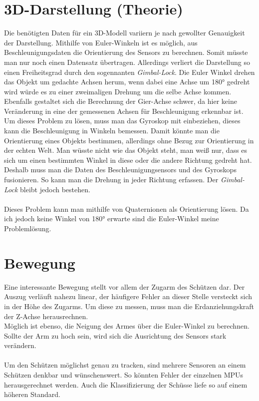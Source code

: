 \section{3D-Darstellung (Theorie)}
Die benötigten Daten für ein 3D-Modell variiern je nach gewollter Genauigkeit der Darstellung.
Mithilfe von Euler-Winkeln ist es möglich, aus Beschleunigungsdaten die Orientierung des Sensors zu berechnen.
Somit müsste man nur noch einen Datensatz übertragen. Allerdings verliert die Darstellung so einen
Freiheitsgrad durch den sogennanten \textit{Gimbal-Lock}. Die Euler Winkel drehen das Objekt um gedachte
Achsen herum, wenn dabei eine Achse um 180° gedreht wird würde es zu einer zweimaligen Drehung
um die selbe Achse kommen. Ebenfalls gestaltet sich die Berechnung der Gier-Achse schwer, da hier
keine Veränderung in eine der gemessenen Achsen für Beschleunigung erkennbar ist.
\\
Um dieses Problem zu lösen, muss man das Gyroskop mit einbeziehen, dieses kann die Beschleunigung
in Winkeln bemessen. Damit könnte man die Orientierung eines Objekts bestimmen, allerdings ohne 
Bezug zur Orientierung in der echten Welt. Man wüsste nicht wie das Objekt steht, man weiß nur, 
dass es sich um einen bestimmten Winkel in diese oder die andere Richtung gedreht hat. \\
Deshalb muss man die Daten des Beschleunigungsensors und des Gyroskops fusionieren. So kann man 
die Drehung in jeder Richtung erfassen. Der \textit{Gimbal-Lock} bleibt jedoch bestehen.\\
\\
Dieses Problem kann man mithilfe von Quaternionen als Orientierung lösen. Da ich jedoch keine 
Winkel von 180° erwarte sind die Euler-Winkel meine Problemlösung.

\section {Bewegung}
Eine interessante Bewegung stellt vor allem der Zugarm des 
Schützen dar. Der Auszug verläuft nahezu linear, der häufigere Fehler 
an dieser Stelle versteckt sich in der Höhe des Zugarms. 
Um diese zu messen, muss man die Erdanziehungskraft der Z-Achse herausrechnen.\\
Möglich ist ebenso, die Neigung des Armes über die Euler-Winkel zu berechnen. Sollte 
der Arm zu hoch sein, wird sich die Ausrichtung des Sensors stark verändern.\\
\\
Um den Schützen möglichst genau zu tracken, sind mehrere Sensoren an einem Schützen denkbar und
wünschenswert. So könnten Fehler der einzelnen MPUs herausgerechnet werden.
Auch die Klassifizierung der Schüsse liefe so auf einem höheren Standard.